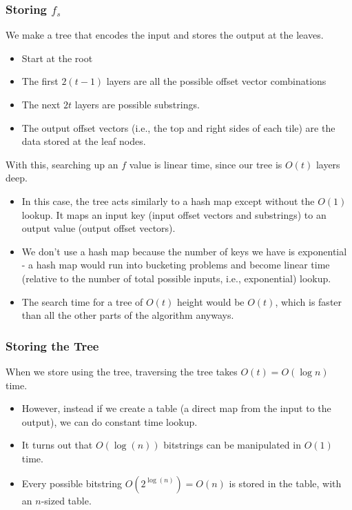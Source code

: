 \documentclass[10pt]{article}
\begin{document}
\subsubsection*{Storing $f_s$}
We make a tree that encodes the input and stores the output at the leaves.
\begin{itemize}
	\item Start at the root
	\item The first $2(t - 1)$ layers are all the possible offset vector combinations
	\item The next $2t$ layers are possible substrings.
	\item The output offset vectors (i.e., the top and right sides of each tile) are the data stored at the leaf nodes.
\end{itemize}
With this, searching up an $f$ value is linear time, since our tree is $O(t)$ layers deep.
\begin{itemize}
	\item In this case, the tree acts similarly to a hash map except without the $O(1)$ lookup.  It maps an input key (input offset vectors and substrings) to an output value (output offset vectors).
	\item We don't use a hash map because the number of keys we have is exponential - a hash map would run into bucketing problems and become linear time (relative to the number of total possible inputs, i.e., exponential) lookup.
	\item The search time for a tree of $O(t)$ height would be $O(t)$, which is faster than all the other parts of the algorithm anyways.
\end{itemize}

\subsubsection*{Storing the Tree}
When we store using the tree, traversing the tree takes $O(t) = O(\log n)$ time.
\begin{itemize}
    \item However, instead if we create a table (a direct map from the input to the output), we can do constant time lookup.
    \item It turns out that $O(\log(n))$ bitstrings can be manipulated in $O(1)$ time.  
    \item Every possible bitstring $O(2^{\log(n)}) = O(n)$ is stored in the table, with an $n$-sized table.
\end{itemize}
\end{document}
